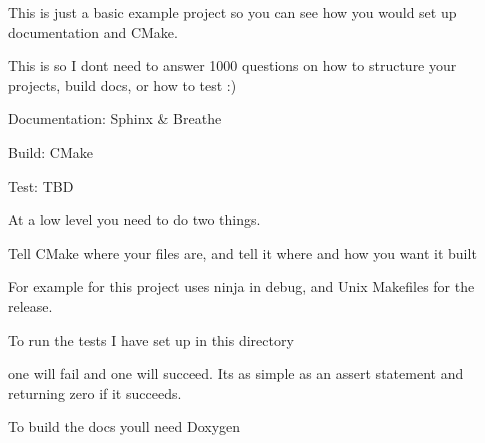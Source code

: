 This is just a basic example project so you can see how you would set up documentation and C\+Make.

This is so I don\textquotesingle{}t need to answer 1000 questions on how to structure your projects, build docs, or how to test \+:)


\begin{DoxyItemize}
\item Documentation\+: Sphinx \& Breathe
\item Build\+: C\+Make
\item Test\+: T\+BD
\end{DoxyItemize}

At a low level you need to do two things.

Tell C\+Make where your files are, and tell it where and how you want it built

For example for this project uses ninja in debug, and Unix Makefiles for the release. 
\begin{DoxyCode}{0}
\DoxyCodeLine{}
\DoxyCodeLine{}
\DoxyCodeLine{}
\DoxyCodeLine{}
\end{DoxyCode}


To run the tests I have set up in this directory 
\begin{DoxyCode}{0}
\end{DoxyCode}


one will fail and one will succeed. It\textquotesingle{}s as simple as an assert statement and returning zero if it succeeds.

To build the docs you\textquotesingle{}ll need Doxygen 
\begin{DoxyCode}{0}
\end{DoxyCode}
 